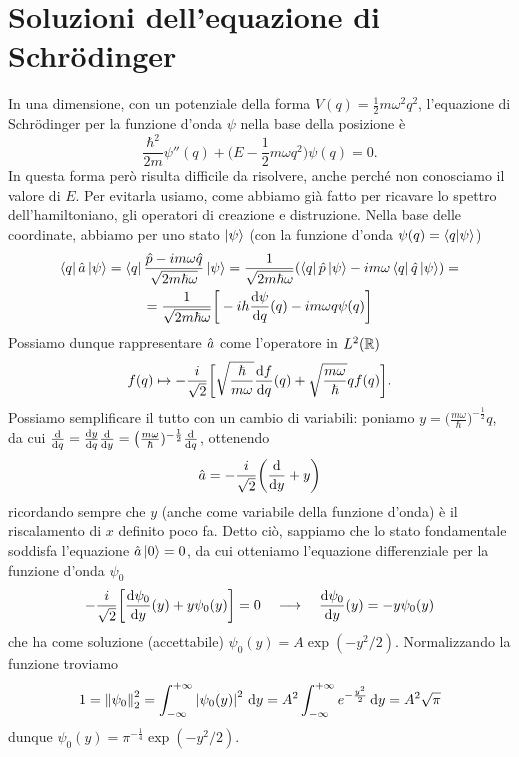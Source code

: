 \section{Soluzioni dell'equazione di Schr\"odinger}
In una dimensione, con un potenziale della forma $V(q)=\frac12m\omega^2q^2$, l'equazione di Schr\"odinger per la funzione d'onda $\psi$ nella base della posizione è
\begin{equation}
	\frac{\hbar^2}{2m}\psi''(q)+\bigg(E-\frac12m\omega q^2\bigg)\psi(q)=0.
	\label{eq:schrodinger-oscillatore-1d}
\end{equation}
In questa forma però risulta difficile da risolvere, anche perch\'e non conosciamo il valore di $E$.
Per evitarla usiamo, come abbiamo già fatto per ricavare lo spettro dell'hamiltoniano, gli operatori di creazione e distruzione.
Nella base delle coordinate, abbiamo per uno stato $\left|{\psi}\right\rangle$ (con la funzione d'onda $\psi(q)=\left\langle{q}\middle|{\psi}\right\rangle$)
\begin{multline}
	\left\langle{q}\right|\hat{a}\left|{\psi}\right\rangle=\left\langle{q}\right|\frac{\hat{p}-im\omega\hat{q}}{\sqrt{2m\hbar\omega}}\left|{\psi}\right\rangle=\frac1{\sqrt{2m\hbar\omega}}(\left\langle{q}\right|\hat{p}\left|{\psi}\right\rangle-im\omega\left\langle{q}\right|\hat{q}\left|{\psi}\right\rangle)=\\
	=\frac1{\sqrt{2m\hbar\omega}}\bigg[-ih\frac{\textup{d} {\psi}}{\textup{d} {q}}(q)-im\omega q\psi(q)\bigg]
\end{multline}
Possiamo dunque rappresentare $\hat{a}$ come l'operatore in $L^2(\mathbb{R})$
\begin{equation}
	f(q)\mapsto-\frac{i}{\sqrt{2}}\bigg[\sqrt{\frac{\hbar}{m\omega}}\frac{\textup{d} {f}}{\textup{d} {q}}(q)+\sqrt{\frac{m\omega}{\hbar}}qf(q)\bigg].
\end{equation}
Possiamo semplificare il tutto con un cambio di variabili: poniamo $y=\big(\frac{m\omega}{\hbar})^{-\frac12}q$, da cui $\frac{\textup{d} {}}{\textup{d} {q}}=\frac{\textup{d} {y}}{\textup{d} {q}}\frac{\textup{d} {}}{\textup{d} {y}}=\big(\frac{m\omega}{\hbar})^{-\frac12}\frac{\textup{d} {}}{\textup{d} {q}}$, ottenendo
\begin{equation}
	\hat{a}=-\frac{i}{\sqrt{2}}\bigg(\frac{\textup{d} {}}{\textup{d} {y}}+y\bigg)
\end{equation}
ricordando sempre che $y$ (anche come variabile della funzione d'onda) è il riscalamento di $x$ definito poco fa.
Detto ciò, sappiamo che lo stato fondamentale soddisfa l'equazione $\hat{a}\left|{0}\right\rangle=0$, da cui otteniamo l'equazione differenziale per la funzione d'onda $\psi_0$
\begin{equation}
	-\frac{i}{\sqrt{2}}\bigg[\frac{\textup{d} {\psi_0}}{\textup{d} {y}}(y)+y\psi_0(y)\bigg]=0\quad\longrightarrow\quad \frac{\textup{d} {\psi_0}}{\textup{d} {y}}(y)=-y\psi_0(y)
\end{equation}
che ha come soluzione (accettabile) $\psi_0(y)=A\exp(-y^2/2)$.
Normalizzando la funzione troviamo
\begin{equation}
	1=\left\|{\psi_0}\right\|_2^2=\int_{-\infty}^{+\infty}\left|{\psi_0(y)}\right|^2\,\textup{d} y=A^2\int_{-\infty}^{+\infty}e^{-\frac{y^2}2}\,\textup{d} y=A^2\sqrt{\pi}
\end{equation}
dunque $\psi_0(y)=\pi^{-\frac14}\exp(-y^2/2)$.

